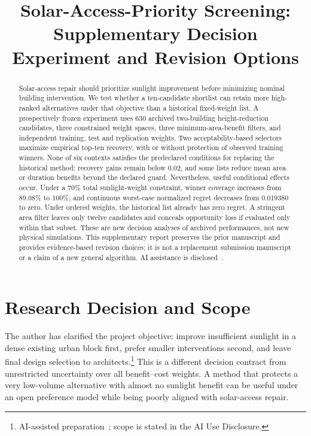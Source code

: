 \documentclass{llncs}
\newcommand{\aidraft}{\footnote{AI-assisted preparation~\cite{openai2026}; scope is stated in the AI Use Disclosure.}}
\begin{document}
\title{Solar-Access-Priority Screening:\\Supplementary Decision Experiment and Revision Options}
\author{}\institute{}\maketitle{}
\begin{abstract}
Solar-access repair should prioritize sunlight improvement before minimizing nominal building intervention. We test whether a ten-candidate shortlist can retain more high-ranked alternatives under that objective than a historical fixed-weight list. A prospectively frozen experiment uses 630 archived two-building height-reduction candidates, three constrained weight spaces, three minimum-area-benefit filters, and independent training, test and replication weights. Two acceptability-based selectors maximize empirical top-ten recovery, with or without protection of observed training winners. None of six contexts satisfies the predeclared conditions for replacing the historical method: recovery gains remain below 0.02, and some lists reduce mean area or duration benefits beyond the declared guard. Nevertheless, useful conditional effects occur. Under a 70\% total sunlight-weight constraint, winner coverage increases from 89.08\% to 100\%, and continuous worst-case normalized regret decreases from 0.019380 to zero. Under ordered weights, the historical list already has zero regret. A stringent area filter leaves only twelve candidates and conceals opportunity loss if evaluated only within that subset. These are new decision analyses of archived performances, not new physical simulations. This supplementary report preserves the prior manuscript and provides evidence-based revision choices; it is not a replacement submission manuscript or a claim of a new general algorithm. AI assistance is disclosed~\cite{openai2026}.
\end{abstract}

\section{Research Decision and Scope}
The author has clarified the project objective: improve insufficient sunlight in a dense existing urban block first, prefer smaller interventions second, and leave final design selection to architects.\aidraft{} This is a different decision contract from unrestricted uncertainty over all benefit--cost weights. A method that protects a very low-volume alternative with almost no sunlight benefit can be useful under an open preference model while being poorly aligned with solar-access repair.
\end{document}

